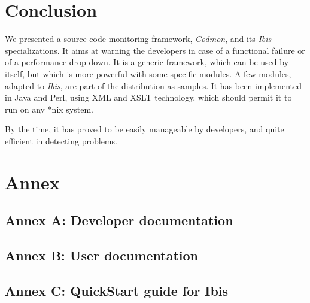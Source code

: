\documentclass[a4paper,10pt]{article}
\renewcommand{\|}{\url|}
\begin{document}
\section{Conclusion}

We presented a source code monitoring framework, \emph{Codmon}, and its \emph{Ibis} specializations. It aims at warning the developers in case of a functional failure or of a performance drop down. It is a generic framework, which can be used by itself, but which is more powerful with some specific modules. A few modules, adapted to \emph{Ibis}, are part of the distribution as samples. It has been implemented in Java and Perl, using XML and XSLT technology, which should permit it to run on any *nix system.

By the time, it has proved to be easily manageable by developers, and quite efficient in detecting problems.


\section{Annex}
\subsection{Annex A: Developer documentation}


\subsection{Annex B: User documentation}


\subsection{Annex C: QuickStart guide for Ibis}

\end{document}
